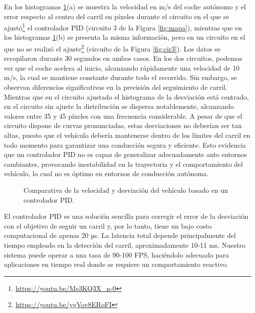En los histogramas \ref{fig:comparativa_pid}(a) se muestra la velocidad en m/s del coche autónomo y el error respecto al centro del carril en píxeles durante el circuito en el que se ajustó\footnote{\url{https://youtu.be/Me3KQ3X_n-0}} el controlador \ac{PID} (circuito 3 de la Figura \ref{fig:mapa}), mientras que en los histogramas \ref{fig:comparativa_pid}(b) se presenta la misma información, pero en un circuito en el que no se realizó el ajuste\footnote{\url{https://youtu.be/ygVov8ERqFI}} (circuito de la Figura \ref{fig:cir3}). Los datos se recopilaron durante 30 segundos en ambos casos. En los dos circuitos, podemos ver que el coche acelera al inicio, alcanzando rápidamente una velocidad de 10 m/s, la cual se mantiene constante durante todo el recorrido. Sin embargo, se observan diferencias significativas en la precisión del seguimiento de carril. Mientras que en el circuito ajustado el histograma de la desviación está centrado, en el circuito sin ajuste la distribución se dispersa notablemente, alcanzando valores entre 35 y 45 píxeles con una frecuencia considerable. A pesar de que el circuito dispone de curvas pronunciadas, estas desviaciones no deberían ser tan altas, puesto que el vehículo debería mantenerse dentro de los límites del carril en todo momento para garantizar una conducción segura y eficiente. Esto evidencia que un controlador \ac{PID} no es capaz de generalizar adecuadamente ante entornos cambiantes, provocando inestabilidad en la trayectoria y el comportamiento del vehículo, lo cual no es óptimo en entornos de conducción autónoma.

\begin{figure}[ht]
\centering
{}
\hfill
{}
\caption{Comparativa de la velocidad y desviación del vehículo basado en un controlador \ac{PID}.}
\label{fig:comparativa_pid}
\end{figure}

El controlador \ac{PID} es una solución sencilla para corregir el error de la desviación con el objetivo de seguir un carril y, por lo tanto, tiene un bajo costo computacional de apenas 20 µs. La latencia total depende principalmente del tiempo empleado en la detección del carril, aproximadamente 10-11 ms. Nuestro sistema puede operar a una tasa de 90-100 \ac{FPS}, haciéndolo adecuado para aplicaciones en tiempo real donde se requiere un comportamiento reactivo.

